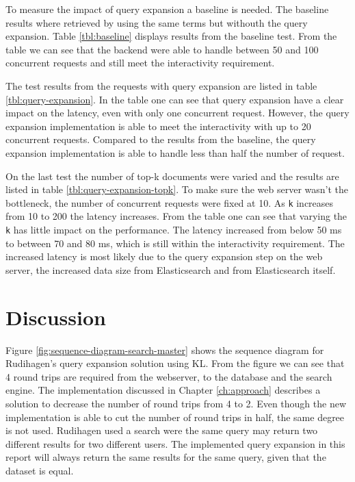 To measure the impact of query expansion a baseline is needed.
The baseline results where retrieved by using the same terms but withouth the query expansion.
Table \ref{tbl:baseline} displays results from the baseline test.
From the table we can see that the backend were able to handle between 50 and 100 concurrent requests and still meet the interactivity requirement.

The test results from the requests with query expansion are listed in table \ref{tbl:query-expansion}.
In the table one can see that query expansion have a clear impact on the latency, even with only one concurrent request.
However, the query expansion implementation is able to meet the interactivity with up to 20 concurrent requests.
Compared to the results from the baseline,
the query expansion implementation is able to handle less than half the number of request.

On the last test the number of top-k documents were varied and the results are listed in table \ref{tbl:query-expansion-topk}.
To make sure the web server wasn't the bottleneck, the number of concurrent requests were fixed at 10.
As \texttt{k} increases from 10 to 200 the latency increases.
From the table one can see that varying the \texttt{k} has little impact on the performance.
The latency increased from below 50 ms to between 70 and 80 ms, which is still within the interactivity requirement.
The increased latency is most likely due to the query expansion step on the web server,
the increased data size from Elasticsearch and from Elasticsearch itself.



\section{Discussion}
Figure \ref{fig:sequence-diagram-search-master} shows the sequence diagram for Rudihagen's query expansion solution using KL.
From the figure we can see that 4 round trips are required from the webserver, to the database and the search engine.
The implementation discussed in Chapter \ref{ch:approach} describes a solution to decrease the number of round trips from 4 to 2.
Even though the new implementation is able to cut the number of round trips in half, the same degree is not used.
Rudihagen used a search were the same query may return two different results for two different users.
The implemented query expansion in this report will always return the same results for the same query, given that the dataset is equal.


